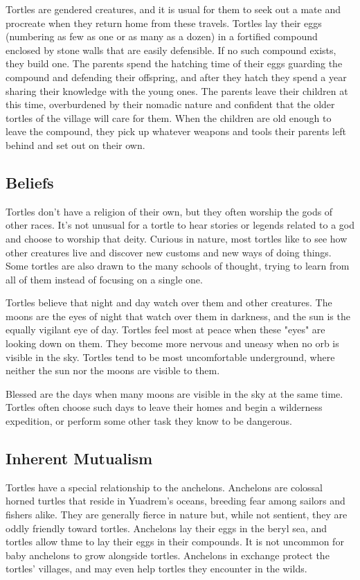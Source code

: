 \begin{linenumbers}
Tortles are gendered creatures, and it is usual for them to seek out a mate and procreate when they return home from these travels.
Tortles lay their eggs (numbering as few as one or as many as a dozen) in a fortified compound enclosed by stone walls that are easily defensible.
If no such compound exists, they build one.
The parents spend the hatching time of their eggs guarding the compound and defending their offspring, and after they hatch they spend a year sharing their knowledge with the young ones.
The parents leave their children at this time, overburdened by their nomadic nature and confident that the older tortles of the village will care for them.
When the children are old enough to leave the compound, they pick up whatever weapons and tools their parents left behind and set out on their own.

\subsection*{Beliefs}
Tortles don't have a religion of their own, but they often worship the gods of other races.
It's not unusual for a tortle to hear stories or legends related to a god and choose to worship that deity.
Curious in nature, most tortles like to see how other creatures live and discover new customs and new ways of doing things.
Some tortles are also drawn to the many schools of thought, trying to learn from all of them instead of focusing on a single one.

Tortles believe that night and day watch over them and other creatures.
The moons are the eyes of night that watch over them in darkness, and the sun is the equally vigilant eye of day.
Tortles feel most at peace when these "eyes" are looking down on them.
They become more nervous and uneasy when no orb is visible in the sky.
Tortles tend to be most uncomfortable underground, where neither the sun nor the moons are visible to them.

Blessed are the days when many moons are visible in the sky at the same time.
Tortles often choose such days to leave their homes and begin a wilderness expedition, or perform some other task they know to be dangerous.

\subsection*{Inherent Mutualism}
Tortles have a special relationship to the anchelons.
Anchelons are colossal horned turtles that reside in Yuadrem's oceans, breeding fear among sailors and fishers alike.
They are generally fierce in nature but, while not sentient, they are oddly friendly toward tortles.
Anchelons lay their eggs in the beryl sea, and tortles allow thme to lay their eggs in their compounds.
It is not uncommon for baby anchelons to grow alongside tortles.
Anchelons in exchange protect the tortles' villages, and may even help tortles they encounter in the wilds.


\end{linenumbers}
